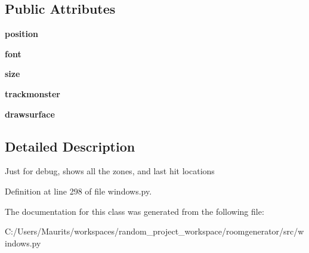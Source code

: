 \subsection*{Public Attributes}
\begin{DoxyCompactItemize}
\item 
\hypertarget{classwindows_1_1_combat_debug_window_adfb257dd47b31d77c02b797b0c4ec9ed}{}{\bfseries position}\label{classwindows_1_1_combat_debug_window_adfb257dd47b31d77c02b797b0c4ec9ed}

\item 
\hypertarget{classwindows_1_1_combat_debug_window_aaf3dc72b52b5000154c04f7eb029f2f8}{}{\bfseries font}\label{classwindows_1_1_combat_debug_window_aaf3dc72b52b5000154c04f7eb029f2f8}

\item 
\hypertarget{classwindows_1_1_combat_debug_window_ab2352163bb3397a0dd3a55a0e37c563c}{}{\bfseries size}\label{classwindows_1_1_combat_debug_window_ab2352163bb3397a0dd3a55a0e37c563c}

\item 
\hypertarget{classwindows_1_1_combat_debug_window_a7fc02692f53288315ad9605dd82cd1a1}{}{\bfseries trackmonster}\label{classwindows_1_1_combat_debug_window_a7fc02692f53288315ad9605dd82cd1a1}

\item 
\hypertarget{classwindows_1_1_combat_debug_window_ac18a32bd132cf0f73e0584493c67dd52}{}{\bfseries drawsurface}\label{classwindows_1_1_combat_debug_window_ac18a32bd132cf0f73e0584493c67dd52}

\end{DoxyCompactItemize}


\subsection{Detailed Description}
\begin{DoxyVerb}Just for debug, shows all the zones, and last hit locations\end{DoxyVerb}
 

Definition at line 298 of file windows.\+py.



The documentation for this class was generated from the following file\+:\begin{DoxyCompactItemize}
\item 
C\+:/\+Users/\+Maurits/workspaces/random\+\_\+project\+\_\+workspace/roomgenerator/src/windows.\+py\end{DoxyCompactItemize}
